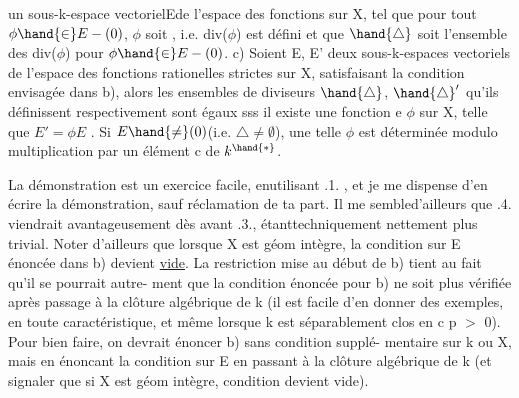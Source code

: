 
un sous-k-espace vectorielEde l'espace des  fonctions    
sur X, tel que pour tout $\phi \hand{\in} E-(0)$, $\phi$ soit  
  , i.e. div($\phi$) est défini 
\unsure{\hand{,}} et que $\hand{\triangle}$ soit l'ensemble des div($\phi$) pour $\phi \hand{\in} E-(0)$.
c) Soient E, E' deux sous-k-espaces vectoriels de l'espace des
fonctions rationelles strictes  sur X,  satisfaisant la condition
envisagée dans b), alors les ensembles de diviseurs $\hand{\triangle}$, $\hand{\triangle}'$ qu'ils
définissent respectivement sont égaux sss il existe une  fonction
e   $\phi$ sur X, telle que $E' = \phi E$ . Si $E\hand{\neq}(0)$(i.e. $\triangle \neq \emptyset$), une
telle $\phi$ est déterminée modulo multiplication par un élément c de $k^{\hand{*}}$.

La démonstration est un exercice facile, enutilisant \hand{\S}.1. , et je
me dispense d'en écrire la démonstration, sauf réclamation de ta part. Il
\placedmargin{||} me sembled'ailleurs que \hand{\S}.4. viendrait avantageusement dès avant \hand{\S}.3.,
étanttechniquement nettement plus trivial. Noter d'ailleurs que lorsque
X est géom intègre, la condition sur E énoncée dans b) devient \uline{vide}.
La restriction mise au début de b) tient au fait qu'il se pourrait autre-%
ment que la condition énoncée pour b) ne soit plus vérifiée après passage
à la clôture algébrique de k (il est facile d'en donner des exemples,
en toute caractéristique, et même lorsque k est séparablement clos en
c p $>$ 0). Pour bien faire, on devrait énoncer b) sans condition supplé-%
mentaire sur k ou X, mais en énoncant la condition sur E en passant à la
clôture algébrique de k (et signaler que si X est géom intègre, 
condition devient vide). 


